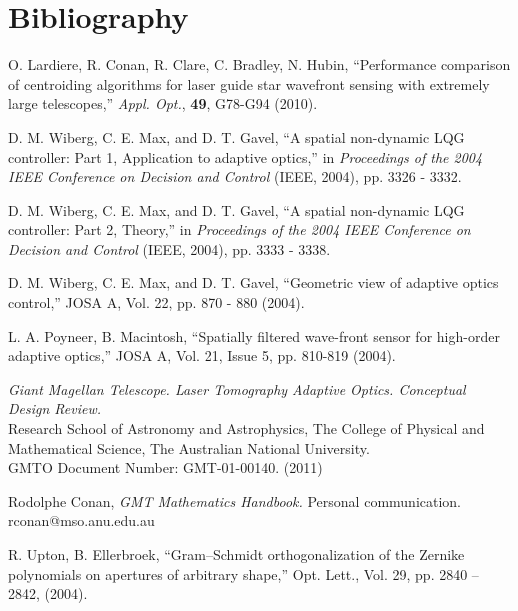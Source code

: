 
\newpage
\section{Bibliography}
\label{sec:biblio}

\begin{thebibliography}{}

O. Lardiere, R. Conan, R. Clare, C. Bradley, N. Hubin,
``Performance comparison of centroiding algorithms for laser guide star
wavefront sensing with extremely large telescopes,'' \emph{Appl. Opt.},
\textbf{49}, G78-G94 (2010).

D. M. Wiberg, C. E. Max, and D. T. Gavel, ``A spatial
non-dynamic LQG controller: Part 1, Application to
adaptive optics,'' in \emph{Proceedings of the 2004 IEEE
Conference on Decision and Control} (IEEE, 2004), pp.
3326 - 3332.

D. M. Wiberg, C. E. Max, and D. T. Gavel, ``A spatial
non-dynamic LQG controller: Part 2, Theory,'' in
\emph{Proceedings of the 2004 IEEE Conference on Decision and
Control} (IEEE, 2004), pp. 3333 - 3338.

D. M. Wiberg, C. E. Max, and D. T. Gavel, ``Geometric view of adaptive optics
control,'' JOSA A, Vol. 22, pp. 870 - 880 (2004).

L. A. Poyneer, B. Macintosh,
``Spatially filtered wave-front sensor for high-order adaptive optics,''
JOSA A, Vol. 21, Issue 5, pp. 810-819 (2004).

\emph{Giant Magellan Telescope. Laser Tomography Adaptive Optics. Conceptual
Design Review.} \\
Research School of Astronomy and Astrophysics, The College of
Physical and Mathematical Science, The Australian National University. \\
GMTO Document Number: GMT-01-00140. (2011)

Rodolphe Conan, \emph{GMT Mathematics Handbook.} Personal communication. \\
rconan@mso.anu.edu.au

R. Upton, B. Ellerbroek,
``Gram–Schmidt orthogonalization of the Zernike polynomials
on apertures of arbitrary shape,''
Opt. Lett., Vol. 29, pp. 2840 -- 2842, (2004).

\end{thebibliography}
